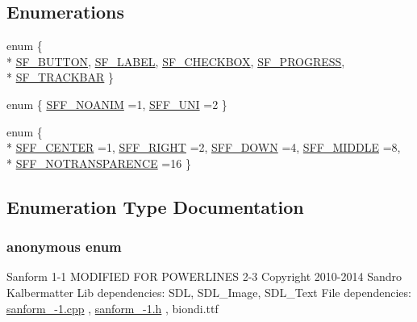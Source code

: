 \subsection*{Enumerations}
\begin{DoxyCompactItemize}
\item 
enum \{ \\*
\hyperlink{sanform__1-1_8h_a06fc87d81c62e9abb8790b6e5713c55ba6c590cdca9659e51dfce81d2aa24e9a6}{S\+F\+\_\+\+B\+U\+T\+T\+O\+N}, 
\hyperlink{sanform__1-1_8h_a06fc87d81c62e9abb8790b6e5713c55ba244bc1e2e83ccf87a175dc2782f5675a}{S\+F\+\_\+\+L\+A\+B\+E\+L}, 
\hyperlink{sanform__1-1_8h_a06fc87d81c62e9abb8790b6e5713c55ba6a0886a14f8b1f0e60db6580459598af}{S\+F\+\_\+\+C\+H\+E\+C\+K\+B\+O\+X}, 
\hyperlink{sanform__1-1_8h_a06fc87d81c62e9abb8790b6e5713c55ba3d04a2327bf32e378cb90d9d84482d17}{S\+F\+\_\+\+P\+R\+O\+G\+R\+E\+S\+S}, 
\\*
\hyperlink{sanform__1-1_8h_a06fc87d81c62e9abb8790b6e5713c55bac6775fa117d9a358c59b2d2a6b7a89ea}{S\+F\+\_\+\+T\+R\+A\+C\+K\+B\+A\+R}
 \}
\item 
enum \{ \hyperlink{sanform__1-1_8h_adf764cbdea00d65edcd07bb9953ad2b7a05722d7f7b083b042142cc65d20a766f}{S\+F\+F\+\_\+\+N\+O\+A\+N\+I\+M} =1, 
\hyperlink{sanform__1-1_8h_adf764cbdea00d65edcd07bb9953ad2b7a260157977ff2f186409d5dc36514bc65}{S\+F\+F\+\_\+\+U\+N\+I} =2
 \}
\item 
enum \{ \\*
\hyperlink{sanform__1-1_8h_a99fb83031ce9923c84392b4e92f956b5a75d261e7e0365c8b0c7d7c55f1cdbde4}{S\+F\+F\+\_\+\+C\+E\+N\+T\+E\+R} =1, 
\hyperlink{sanform__1-1_8h_a99fb83031ce9923c84392b4e92f956b5a7eb1d5d7c06d0efddb92888d61992476}{S\+F\+F\+\_\+\+R\+I\+G\+H\+T} =2, 
\hyperlink{sanform__1-1_8h_a99fb83031ce9923c84392b4e92f956b5ab4506e0a3f3c7e6fb292eb6811f92af2}{S\+F\+F\+\_\+\+D\+O\+W\+N} =4, 
\hyperlink{sanform__1-1_8h_a99fb83031ce9923c84392b4e92f956b5abdb73de3cda5a968e372e1982e6bb6cd}{S\+F\+F\+\_\+\+M\+I\+D\+D\+L\+E} =8, 
\\*
\hyperlink{sanform__1-1_8h_a99fb83031ce9923c84392b4e92f956b5a51a4bf942f321a26edb2af7328001020}{S\+F\+F\+\_\+\+N\+O\+T\+R\+A\+N\+S\+P\+A\+R\+E\+N\+C\+E} =16
 \}
\end{DoxyCompactItemize}


\subsection{Enumeration Type Documentation}
\hypertarget{sanform__1-1_8h_a06fc87d81c62e9abb8790b6e5713c55b}{}\subsubsection[{anonymous enum}]{\setlength{\rightskip}{0pt plus 5cm}anonymous enum}\label{sanform__1-1_8h_a06fc87d81c62e9abb8790b6e5713c55b}
Sanform 1-\/1 M\+O\+D\+I\+F\+I\+E\+D F\+O\+R P\+O\+W\+E\+R\+L\+I\+N\+E\+S 2-\/3 Copyright 2010-\/2014 Sandro Kalbermatter Lib dependencies\+: S\+D\+L, S\+D\+L\+\_\+\+Image, S\+D\+L\+\_\+\+Text File dependencies\+: \hyperlink{sanform__1-1_8cpp}{sanform\+\_-\/1.\+cpp} , \hyperlink{sanform__1-1_8h}{sanform\+\_-\/1.\+h} , biondi.\+ttf

